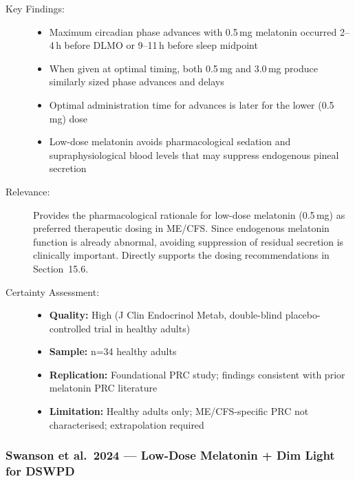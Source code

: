 \begin{description}
    \item[Key Findings:]
    \begin{itemize}
        \item Maximum circadian phase advances with 0.5\,mg melatonin occurred 2--4\,h before DLMO or 9--11\,h before sleep midpoint
        \item When given at optimal timing, both 0.5\,mg and 3.0\,mg produce similarly sized phase advances and delays
        \item Optimal administration time for advances is later for the lower (0.5\,mg) dose
        \item Low-dose melatonin avoids pharmacological sedation and supraphysiological blood levels that may suppress endogenous pineal secretion
    \end{itemize}
    \item[Relevance:] Provides the pharmacological rationale for low-dose melatonin (0.5\,mg) as preferred therapeutic dosing in ME/CFS. Since endogenous melatonin function is already abnormal, avoiding suppression of residual secretion is clinically important. Directly supports the dosing recommendations in Section~15.6.
    \item[Certainty Assessment:]
    \begin{itemize}
        \item \textbf{Quality:} High (J Clin Endocrinol Metab, double-blind placebo-controlled trial in healthy adults)
        \item \textbf{Sample:} n=34 healthy adults
        \item \textbf{Replication:} Foundational PRC study; findings consistent with prior melatonin PRC literature
        \item \textbf{Limitation:} Healthy adults only; ME/CFS-specific PRC not characterised; extrapolation required
    \end{itemize}
\end{description}

\subsubsection*{Swanson et al.\ 2024 --- Low-Dose Melatonin + Dim Light for DSWPD}


